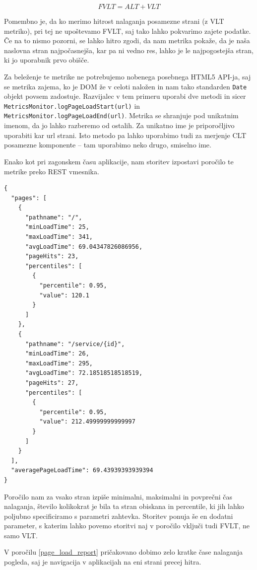 \documentclass[a4paper, 12pt]{book}
\begin{document}
\begin{equation}
\label{eq-01}
FVLT = ALT + VLT
\end{equation}

Pomembno je, da ko merimo hitrost nalaganja posamezne strani (z VLT metriko), pri tej ne upoštevamo FVLT, saj tako lahko pokvarimo zajete podatke. Če na to nismo pozorni, se lahko hitro zgodi, da nam metrika pokaže, da je naša naslovna stran najpočasnejša, kar pa ni vedno res, lahko je le najpogostejša stran, ki jo uporabnik prvo obišče.

Za beleženje te metrike ne potrebujemo nobenega posebnega HTML5 API-ja, saj se metrika zajema, ko je DOM že v celoti naložen in nam tako standarden \verb|Date| objekt povsem zadostuje. Razvijalec v tem primeru uporabi dve metodi in sicer \verb|MetricsMonitor.logPageLoadStart(url)| in \\ \verb|MetricsMonitor.logPageLoadEnd(url)|. Metrika se shranjuje pod unikatnim imenom, da jo lahko razberemo od ostalih. Za unikatno ime je priporočljivo uporabiti kar url strani. Isto metodo pa lahko uporabimo tudi za merjenje CLT posamezne komponente – tam uporabimo neko drugo, smiselno ime.
 
Enako kot pri zagonskem času aplikacije, nam storitev izpostavi poročilo te metrike preko REST vmesnika.

\begin{lstlisting}[label=page_load_report, caption=Poročilo časa nalaganja pogleda]
{
  "pages": [
    {
      "pathname": "/",
      "minLoadTime": 25,
      "maxLoadTime": 341,
      "avgLoadTime": 69.04347826086956,
      "pageHits": 23,
      "percentiles": [
        {
          "percentile": 0.95,
          "value": 120.1
        }
      ]
    },
    {
      "pathname": "/service/{id}",
      "minLoadTime": 26,
      "maxLoadTime": 295,
      "avgLoadTime": 72.18518518518519,
      "pageHits": 27,
      "percentiles": [
        {
          "percentile": 0.95,
          "value": 212.49999999999997
        }
      ]
    }
  ],
  "averagePageLoadTime": 69.43939393939394
}
\end{lstlisting}

Poročilo nam za vsako stran izpiše minimalni, maksimalni in povprečni čas nalaganja, število kolikokrat je bila ta stran obiskana in percentile, ki jih lahko poljubno specificiramo s parametri zahtevka. Storitev ponuja še en dodatni parameter, s katerim lahko povemo storitvi naj v poročilo vključi tudi FVLT, ne samo VLT.

V poročilu \ref{page_load_report} pričakovano dobimo zelo kratke čase nalaganja pogleda, saj je navigacija v aplikacijah na eni strani precej hitra.
\end{document}
